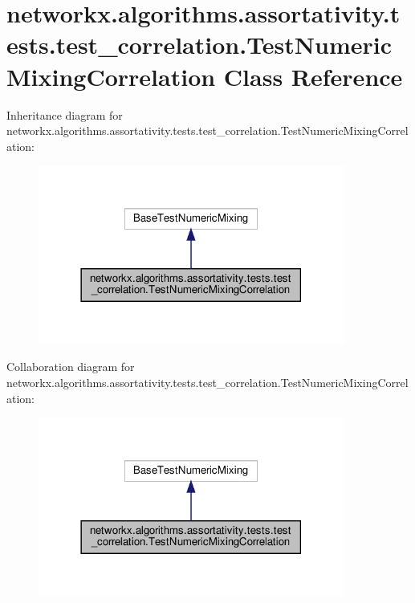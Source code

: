\hypertarget{classnetworkx_1_1algorithms_1_1assortativity_1_1tests_1_1test__correlation_1_1TestNumericMixingCorrelation}{}\section{networkx.\+algorithms.\+assortativity.\+tests.\+test\+\_\+correlation.\+Test\+Numeric\+Mixing\+Correlation Class Reference}
\label{classnetworkx_1_1algorithms_1_1assortativity_1_1tests_1_1test__correlation_1_1TestNumericMixingCorrelation}


Inheritance diagram for networkx.\+algorithms.\+assortativity.\+tests.\+test\+\_\+correlation.\+Test\+Numeric\+Mixing\+Correlation\+:
\nopagebreak
\begin{figure}[H]
\begin{center}
\leavevmode
\includegraphics[width=285pt]{classnetworkx_1_1algorithms_1_1assortativity_1_1tests_1_1test__correlation_1_1TestNumericMixingCorrelation__inherit__graph}
\end{center}
\end{figure}


Collaboration diagram for networkx.\+algorithms.\+assortativity.\+tests.\+test\+\_\+correlation.\+Test\+Numeric\+Mixing\+Correlation\+:
\nopagebreak
\begin{figure}[H]
\begin{center}
\leavevmode
\includegraphics[width=285pt]{classnetworkx_1_1algorithms_1_1assortativity_1_1tests_1_1test__correlation_1_1TestNumericMixingCorrelation__coll__graph}
\end{center}
\end{figure}
